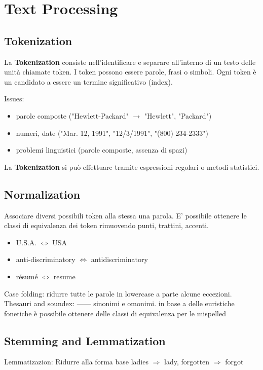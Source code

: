 \chapter{Text Processing}

\section{Tokenization}
La \textbf{Tokenization} consiste nell'identificare e separare all'interno di un testo delle unità chiamate token.
I token possono essere parole, frasi o simboli. Ogni token è un candidato a essere un termine significativo (index).


Issues:
\begin{itemize}
  \item parole composte ("Hewlett-Packard" $\rightarrow$ "Hewlett", "Packard")
  \item numeri, date ("Mar. 12, 1991", "12/3/1991", "(800) 234-2333")
  \item problemi linguistici (parole composte, assenza di spazi)
\end{itemize}

La \textbf{Tokenization} si può effettuare tramite espressioni regolari o metodi statistici.

\section{Normalization}
Associare diversi possibili token alla stessa una parola.
E' possibile ottenere le classi di equivalenza dei token rimuovendo punti, trattini, accenti.

\begin{itemize}
  \item U.S.A. $\Leftrightarrow$ USA
  \item anti-discriminatory $\Leftrightarrow$ antidiscriminatory
  \item résumé $\Leftrightarrow$ resume
\end{itemize}

Case folding: ridurre tutte le parole in lowercase a parte alcune eccezioni.
Thesauri and soundex: ------ sinonimi e omonimi.
in base a delle euristiche fonetiche è possibile ottenere delle classi di equivalenza per le mispelled

\section{Stemming and Lemmatization}
Lemmatizazion: Ridurre alla forma base
ladies $\Rightarrow$ lady, forgotten $\Rightarrow$ forgot

